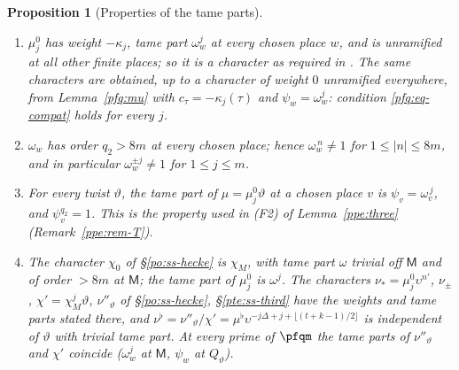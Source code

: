 \documentclass[10pt]{amsart}
\newtheorem{proposition}[theorem]{Proposition}
\theoremstyle{definition}
\theoremstyle{remark}
\begin{document}
\begin{proposition}[Properties of the tame parts]\label{pfq:tame}
\begin{enumerate}
\item[(T1)] $\mu^0_j$ has weight $-\kappa_j$, tame part $\omega_w^j$ at every chosen place $w$, and is unramified at all other finite
places; so it is a character as required in {\cite[\S14.3]{P46}}. The same characters are obtained, up to a character of weight $0$
unramified everywhere, from Lemma~\ref{pfq:mu} with $c_\tau=-\kappa_j(\tau)$ and $\psi_w=\omega_w^j$: condition \eqref{pfq:eq-compat}
holds for every $j$.
\item[(T2)] $\omega_w$ has order $q_2>8m$ at every chosen place; hence $\omega_w^{\,n}\ne1$ for $1\le|n|\le8m$, and in particular
$\omega_w^{\pm j}\ne1$ for $1\le j\le m$.
\item[(T3)] For every twist $\vartheta$, the tame part of $\mu=\mu^0_j\vartheta$ at a chosen place $v$ is $\psi_v=\omega_v^{\,j}$, and
$\psi_v^{q_2}=1$. This is the property used in (F2) of Lemma~\ref{ppe:three} (Remark~\ref{ppe:rem-T}).
\item[(T4)] The character $\chi_0$ of \S\ref{po:ss-hecke} is $\chi_M$, with tame part $\omega$ trivial off $\mathsf M$ and of order
$>8m$ at $\mathsf M$; the tame part of $\mu^0_j$ is $\omega^j$. The characters $\nu_\ast=\mu^0_j\upsilon^{n'}$, $\nu_\pm$,
$\chi'=\chi_M^j\vartheta$, $\nu''_\vartheta$ of \S\ref{po:ss-hecke}, \S\ref{pte:ss-third} have the weights and tame parts stated there,
and $\nu^\flat=\nu''_\vartheta/\chi'=\mu^\flat\upsilon^{-j\Delta+j+\lfloor(t+k-1)/2\rfloor}$ is independent of $\vartheta$ with trivial tame part. At every
prime of $\pfqm$ the tame parts of $\nu''_\vartheta$ and $\chi'$ coincide ($\omega^j_w$ at $\mathsf M$, $\psi_w$ at $Q_\vartheta$).
\end{enumerate}
\end{proposition}
\end{document}
